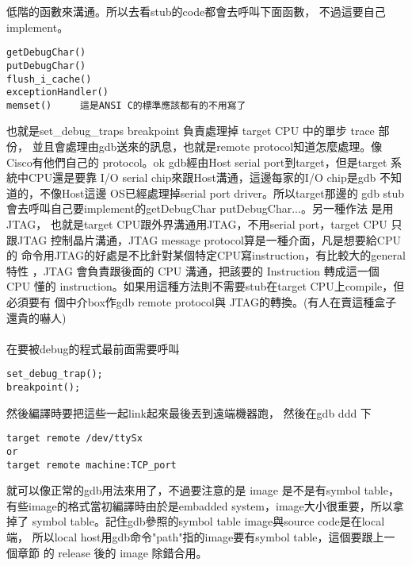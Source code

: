     低階的函數來溝通。所以去看stub的code都會去呼叫下面函數， 不過這要自己
    implement。
    \begin{verbatim}	
getDebugChar()
putDebugChar()
flush_i_cache()
exceptionHandler()
memset()     這是ANSI C的標準應該都有的不用寫了
    \end{verbatim}	
    也就是set\_debug\_traps breakpoint 負責處理掉 target CPU 中的單步 trace 
    部份， 並且會處理由gdb送來的訊息，也就是remote protocol知道怎麼處理。像
    Cisco有他們自己的 protocol。ok gdb經由Host serial port到target，但是target
    系統中CPU還是要靠 I/O serial chip來跟Host溝通，這邊每家的I/O chip是gdb
    不知道的，不像Host這邊 OS已經處理掉serial port driver。所以target那邊的
    gdb stub會去呼叫自己要implement的getDebugChar putDebugChar...。另一種作法
    是用JTAG， 也就是target CPU跟外界溝通用JTAG，不用serial port，target CPU
    只跟JTAG 控制晶片溝通，JTAG message protocol算是一種介面，凡是想要給CPU的
    命令用JTAG的好處是不比針對某個特定CPU寫instruction，有比較大的general特性
    ，JTAG 會負責跟後面的 CPU 溝通，把該要的 Instruction 轉成這一個 CPU 懂的
    instruction。如果用這種方法則不需要stub在target CPU上compile，但必須要有
    個中介box作gdb remote protocol與 JTAG的轉換。(有人在賣這種盒子還貴的嚇人)
    \\\\  
    在要被debug的程式最前面需要呼叫
    \begin{verbatim}	
set_debug_trap();
breakpoint();
    \end{verbatim}	
    然後編譯時要把這些一起link起來最後丟到遠端機器跑，
    然後在gdb ddd 下
  	
    \begin{verbatim}	
target remote /dev/ttySx
or
target remote machine:TCP_port
    \end{verbatim}	
    就可以像正常的gdb用法來用了，不過要注意的是 image 是不是有symbol table，
    有些image的格式當初編譯時由於是embadded system，image大小很重要，所以拿掉了
    symbol table。記住gdb參照的symbol table image與source code是在local端，
    所以local host用gdb命令"path"指的image要有symbol table，這個要跟上一個章節
    的 release 後的 image 除錯合用。
